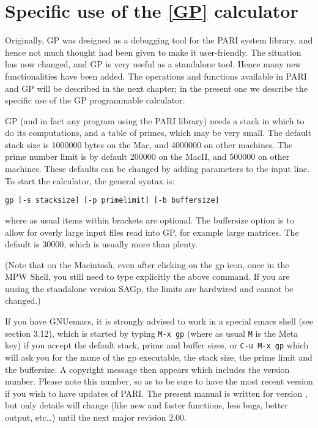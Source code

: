 \chapter{Specific use of the {\bf \ref{GP}} calculator}

Originally, GP was designed as a debugging tool for the PARI system library,
and hence not much thought had been given to make it user-friendly. The
situation has now changed, and GP is very useful as a standalone
tool. Hence many new functionalities have been added.
The operations and functions available in PARI
and GP will be described  in the next chapter; in the present one we describe
the specific use of the GP programmable calculator.

GP (and in fact any program using the PARI library) needs a stack in which
to do its computations, and a table of primes, which may be very small.
The default stack size is 1000000 bytes on the Mac, and 4000000 on
other machines. The prime number limit is by default
200000 on the MacII, and 500000 on other machines. These defaults can be
changed by adding parameters to the input line. To start the
calculator, the general syntax is:

\centerline{\tt gp [-s stacksize] [-p primelimit] [-b buffersize]}

where as usual items within brackets are optional. The buffersize option is
to allow for overly large input files read into GP, for example large
matrices. The default is 30000, which is usually more than plenty.

(Note that on the Macintosh, even after clicking on the gp icon,
once in the MPW Shell, you still need to type explicitly the above command.
If you are uusing the standalone version SAGp, the limits are hardwired and
cannot be changed.)

If you have GNUemacs, it is strongly advised to work in a special emacs
shell (see section 3.12), which is started by typing {\tt M-x gp}
(where as usual {\tt M} is the Meta key) if you accept the default
stack, prime and buffer sizes, or {\tt C-u M-x gp} which will ask you for
the name of the gp executable, the stack size, the prime limit and the
buffersize. 
\smallskip
A copyright message then appears which includes the version
number. Please note this number, so as to be sure to have the most recent
version if you wish to have updates of PARI. The present manual is written
for version \vers, but only details will change (like new and faster functions,
less bugs, better output, etc\dots ) until the next major revision 2.00.


